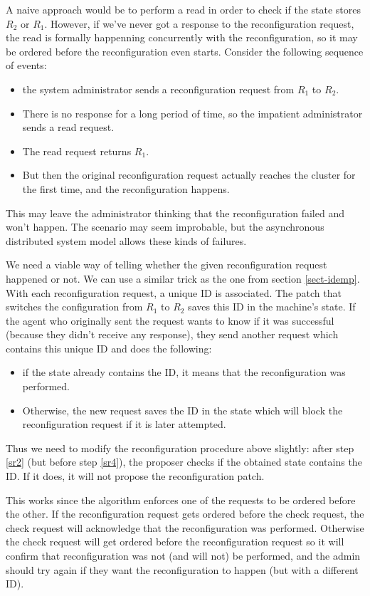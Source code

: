 \documentclass[12pt,a4paper,en]{pracamgr}
\begin{document}
A naive approach would be to perform a read in order to check if the state stores $R_2$ or $R_1$. However, if we've never got a response to the reconfiguration request, the read is formally happenning concurrently with the reconfiguration, so it may be ordered before the reconfiguration even starts. Consider the following sequence of events:
\begin{itemize}
    \item the system administrator sends a reconfiguration request from $R_1$ to $R_2$.
    \item There is no response for a long period of time, so the impatient administrator sends a read request.
    \item The read request returns $R_1$.
    \item But then the original reconfiguration request actually reaches the cluster for the first time, and the reconfiguration happens. 
\end{itemize}
This may leave the administrator thinking that the reconfiguration failed and won't happen. The scenario may seem improbable, but the asynchronous distributed system model allows these kinds of failures.

We need a viable way of telling whether the given reconfiguration request happened or not. We can use a similar trick as the one from section \ref{sect-idemp}. With each reconfiguration request, a unique ID is associated. The patch that switches the configuration from $R_1$ to $R_2$ saves this ID in the machine's state. If the agent who originally sent the request wants to know if it was successful (because they didn't receive any response), they send another request which contains this unique ID and does the following:
\begin{itemize}
    \item if the state already contains the ID, it means that the reconfiguration was performed.
    \item Otherwise, the new request saves the ID in the state which will block the reconfiguration request if it is later attempted.
\end{itemize}
Thus we need to modify the reconfiguration procedure above slightly: after step \ref{sr2} (but before step \ref{sr4}), the proposer checks if the obtained state contains the ID. If it does, it will not propose the reconfiguration patch.

This works since the algorithm enforces one of the requests to be ordered before the other. If the reconfiguration request gets ordered before the check request, the check request will acknowledge that the reconfiguration was performed. Otherwise the check request will get ordered before the reconfiguration request so it will confirm that reconfiguration was not (and will not) be performed, and the admin should try again if they want the reconfiguration to happen (but with a different ID).
\end{document}
